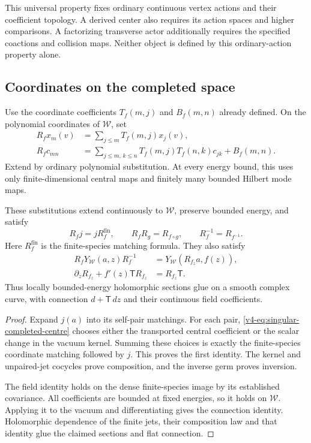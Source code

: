 This universal property fixes ordinary
continuous vertex actions and their
coefficient topology. A derived center
also requires its action spaces and
higher comparisons. A factorizing
transverse actor additionally requires
the specified coactions and collision
maps. Neither object is defined by
this ordinary-action property alone.

\subsection{Coordinates on the completed space}

Use the coordinate coefficients
\(T_f(m,j)\) and \(B_f(m,n)\) already
defined. On the polynomial coordinates
of \(\mathcal W\), set
\begin{align}
 R_fx_m(v)&=\sum_{j\leq m}T_f(m,j)x_j(v),
                    \label{v4-eq:singular-completed-current}\\
 R_fc_{mn}&=\sum_{j\leq m,\,k\leq n}
            T_f(m,j)T_f(n,k)c_{jk}+B_f(m,n).
                    \label{v4-eq:singular-completed-centre}
\end{align}
Extend by ordinary polynomial substitution.
At every energy bound, this uses only
finite-dimensional central maps and
finitely many bounded Hilbert mode maps.

\begin{theorem}\label{v4-thm:singular-completed-coordinates}
These substitutions extend continuously
to \(\mathcal W\), preserve bounded energy,
and satisfy
\[
 R_fj=jR_f^{\mathrm{fin}},\qquad
 R_fR_g=R_{f\circ g},\qquad R_f^{-1}=R_{f^{-1}}.
\]
Here \(R_f^{\mathrm{fin}}\) is the finite-species
matching formula. They also satisfy
\begin{align}
 R_fY_{\mathcal W}(a,z)R_f^{-1}
   &=Y_{\mathcal W}(R_{f_z}a,f(z)),
                   \label{v4-eq:singular-completed-covariance}\\
 \partial_zR_{f_z}+f'(z)\mathsf T R_{f_z}
   &=R_{f_z}\mathsf T.
                   \label{v4-eq:singular-completed-connection}
\end{align}
Thus locally bounded-energy holomorphic
sections glue on a smooth complex curve,
with connection \(d+\mathsf T\,dz\) and
their continuous field coefficients.
\end{theorem}

\begin{proof}
Expand \(j(a)\) into its self-pair matchings.
For each pair, \eqref{v4-eq:singular-completed-centre}
chooses either the transported central
coefficient or the scalar change in the
vacuum kernel. Summing these choices
is exactly the finite-species coordinate
matching followed by \(j\). This proves
the first identity. The kernel and
unpaired-jet cocycles prove composition,
and the inverse germ proves inversion.

The field identity holds on the dense
finite-species image by its established
covariance. All coefficients are bounded
at fixed energies, so it holds on
\(\mathcal W\). Applying it to the
vacuum and differentiating gives the
connection identity. Holomorphic dependence
of the finite jets, their composition
law and that identity glue the claimed
sections and flat connection.
\end{proof}

